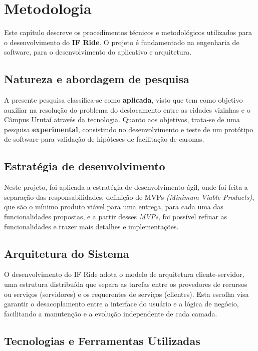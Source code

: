 \chapter{Metodologia}

Este capítulo descreve os procedimentos técnicos e metodológicos utilizados para o desenvolvimento do \textbf{IF Ride}. O projeto é fundamentado na engenharia de software, para o desenvolvimento do aplicativo e arquitetura.

\section{Natureza e abordagem de pesquisa}

A presente pesquisa classifica-se como \textbf{aplicada}, visto que tem como objetivo auxiliar na resolução do problema do deslocamento entre as cidades vizinhas e o Câmpus Urutaí através da tecnologia.
Quanto aos objetivos, trata-se de uma pesquisa \textbf{experimental}, consistindo no desenvolvimento e teste de um protótipo de software para validação de hipóteses de facilitação de caronas.

\section{Estratégia de desenvolvimento}

Neste projeto, foi aplicada a estratégia de desenvolvimento ágil, onde foi feita a separação das responsabilidades, definição de MVPs \textit{(Minimum Viable Products)}, que são o mínimo produto viável para uma entrega, para cada uma das funcionalidades propostas, e a partir desses \textit{MVPs}, foi possível refinar as funcionalidades e trazer mais detalhes e implementações. 

\section{Arquitetura do Sistema}

O desenvolvimento do IF Ride adota o modelo de arquitetura cliente-servidor, uma estrutura distribuída que separa as tarefas entre os provedores de recursos ou serviços (servidores) e os requerentes de serviços (clientes). Esta escolha visa garantir o desacoplamento entre a interface do usuário e a lógica de negócio, facilitando a manutenção e a evolução independente de cada camada.

\section{Tecnologias e Ferramentas Utilizadas}

